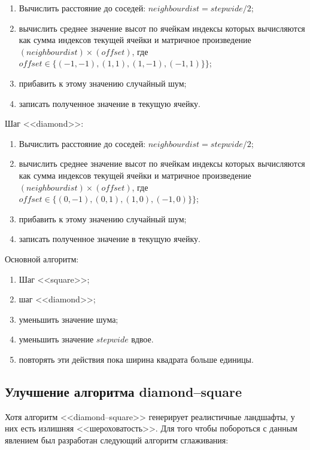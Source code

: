 \begin{enumerate}
	\item Вычислить расстояние до соседей: $neighbour dist = step wide / 2$;
	\item вычислить среднее значение высот по ячейкам индексы которых вычисляются как сумма индексов текущей ячейки и матричное произведение $(neighbour dist) \times (offset)$, где $offset \in \{(-1, -1), (1, 1), (1, -1), (-1, 1)\}\}$;
	\item прибавить к этому значению случайный шум;
	\item записать полученное значение в текущую ячейку.
\end{enumerate}

Шаг <<diamond>>:

\begin{enumerate}
	\item Вычислить расстояние до соседей: $neighbour dist = step wide / 2$;
	\item вычислить среднее значение высот по ячейкам индексы которых вычисляются как сумма индексов текущей ячейки и матричное произведение $(neighbour dist) \times (offset)$, где $offset \in \{(0, -1), (0, 1), (1, 0), (-1, 0)\}\}$;
	\item прибавить к этому значению случайный шум;
	\item записать полученное значение в текущую ячейку.
\end{enumerate}

Основной алгоритм:

\begin{enumerate}
	\item Шаг <<square>>;
	\item шаг <<diamond>>;
	\item уменьшить значение шума;
	\item уменьшить значение $step wide$ вдвое.
	\item повторять эти действия пока ширина квадрата больше единицы.
\end{enumerate}

\subsection{Улучшение алгоритма diamond--square}

Хотя алгоритм <<diamond--square>> генерирует реалистичные ландшафты, у них есть излишняя <<шероховатость>>. Для того чтобы побороться с данным явлением был разработан следующий алгоритм сглаживания:

